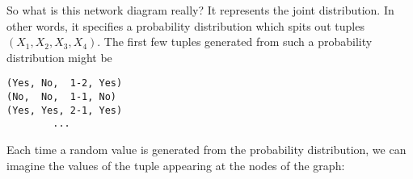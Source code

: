 
So what is this network diagram really? It represents the joint distribution. In other words, it specifies a probability distribution which spits out tuples $(X_1, X_2, X_3, X_4)$. The first few tuples generated from such a probability distribution might be

\begin{verbatim}
(Yes, No,  1-2, Yes)
(No,  No,  1-1, No)
(Yes, Yes, 2-1, Yes)
        ...
\end{verbatim}

Each time a random value is generated from the probability distribution, we can imagine the values of the tuple appearing at the nodes of the graph:

